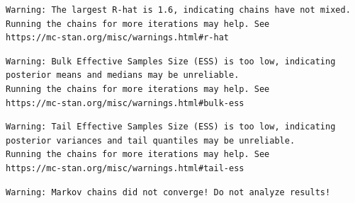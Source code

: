 \documentclass[
  letterpaper,
  DIV=11,
  numbers=noendperiod]{scrartcl}
\begin{document}
\begin{verbatim}
Warning: The largest R-hat is 1.6, indicating chains have not mixed.
Running the chains for more iterations may help. See
https://mc-stan.org/misc/warnings.html#r-hat
\end{verbatim}

\begin{verbatim}
Warning: Bulk Effective Samples Size (ESS) is too low, indicating posterior means and medians may be unreliable.
Running the chains for more iterations may help. See
https://mc-stan.org/misc/warnings.html#bulk-ess
\end{verbatim}

\begin{verbatim}
Warning: Tail Effective Samples Size (ESS) is too low, indicating posterior variances and tail quantiles may be unreliable.
Running the chains for more iterations may help. See
https://mc-stan.org/misc/warnings.html#tail-ess
\end{verbatim}

\begin{verbatim}
Warning: Markov chains did not converge! Do not analyze results!
\end{verbatim}
\end{document}
